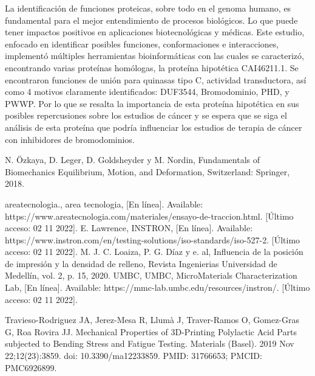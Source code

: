 \documentclass[journal,transmag]{IEEEtran}
\begin{document}
   La identificación de funciones proteicas, sobre todo en el genoma humano, es fundamental para el mejor entendimiento de procesos biológicos. Lo que puede tener impactos positivos en aplicaciones biotecnológicas y médicas. Este estudio, enfocado en identificar posibles funciones, conformaciones e interacciones, implementó múltiples herramientas bioinformáticas con las cuales se caracterizó, encontrando varias proteínas homólogas, la proteína hipotética CAI46211.1. Se encontraron funciones de unión para quinasas tipo C, actividad transductora, así como 4 motivos claramente identificados: DUF3544, Bromodominio, PHD, y PWWP. Por lo que se resalta la importancia de esta proteína hipotética en sus posibles repercusiones sobre los estudios de cáncer y se espera que se siga el análisis de esta proteína que podría influenciar los estudios de terapia de cáncer con inhibidores de bromodominios.  



\ifCLASSOPTIONcaptionsoff
  \newpage
\fi


\begin{thebibliography}{1}


  N. Özkaya, D. Leger, D. Goldsheyder y M. Nordin, Fundamentals of Biomechanics Equilibrium, Motion, and Deformation, Switzerland: Springer, 2018. 
 

areatecnologia., area tecnologia, [En línea]. Available: https://www.areatecnologia.com/materiales/ensayo-de-traccion.html. [Último acceso: 02 11 2022].
E. Lawrence, INSTRON, [En línea]. Available: https://www.instron.com/en/testing-solutions/iso-standards/iso-527-2. [Último acceso: 02 11 2022].
M. J. C. Loaiza, P. G. Díaz y e. al, Influencia de la posición de impresión y la densidad de relleno, Revista Ingenierias Universidad de Medellín, vol. 2, p. 15, 2020. 
UMBC, UMBC, MicroMaterials Characterization Lab, [En línea]. Available: https://mmc-lab.umbc.edu/resources/instron/. [Último acceso: 02 11 2022].

Travieso-Rodriguez JA, Jerez-Mesa R, Llumà J, Traver-Ramos O, Gomez-Gras G, Roa Rovira JJ. Mechanical Properties of 3D-Printing Polylactic Acid Parts subjected to Bending Stress and Fatigue Testing. Materials (Basel). 2019 Nov 22;12(23):3859. doi: 10.3390/ma12233859. PMID: 31766653; PMCID: PMC6926899.


\end{thebibliography}
\end{document}
